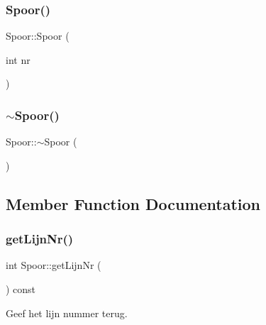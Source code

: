 \mbox{\label{class_spoor_a6f151487bb74b4ca549a6db47932f8bd}} 
\subsubsection{\texorpdfstring{Spoor()}{Spoor()}\hspace{0.1cm}{\footnotesize\ttfamily [2/2]}}
{\footnotesize\ttfamily Spoor\+::\+Spoor (\begin{DoxyParamCaption}\item[{int}]{nr }\end{DoxyParamCaption})}

\mbox{\label{class_spoor_a58dcc52a48e4ad3ca7d9028a0065ca98}} 
\subsubsection{\texorpdfstring{$\sim$\+Spoor()}{~Spoor()}}
{\footnotesize\ttfamily Spoor\+::$\sim$\+Spoor (\begin{DoxyParamCaption}{ }\end{DoxyParamCaption})\hspace{0.3cm}{\ttfamily [virtual]}}



\subsection{Member Function Documentation}
\mbox{\label{class_spoor_a66ebc0abcb370b1509bd7b3961a8e45a}} 
\subsubsection{\texorpdfstring{get\+Lijn\+Nr()}{getLijnNr()}}
{\footnotesize\ttfamily int Spoor\+::get\+Lijn\+Nr (\begin{DoxyParamCaption}{ }\end{DoxyParamCaption}) const}



Geef het lijn nummer terug. 

